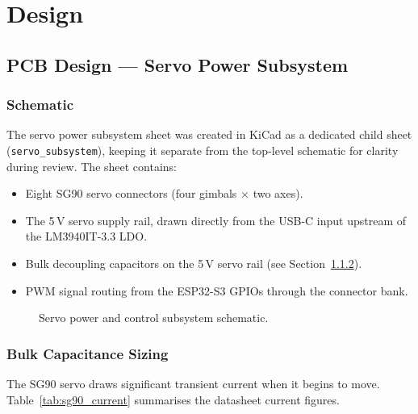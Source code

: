 \documentclass[12pt]{article}
\begin{document}
\section{Design}

\subsection{PCB Design --- Servo Power Subsystem}

\subsubsection{Schematic}

The servo power subsystem sheet was created in KiCad as a dedicated child sheet
(\texttt{servo\_subsystem}), keeping it separate from the top-level schematic for
clarity during review.  The sheet contains:

\begin{itemize}
  \item Eight SG90 servo connectors (four gimbals $\times$ two axes).
  \item The 5\,V servo supply rail, drawn directly from the USB-C input
        upstream of the LM3940IT-3.3 LDO.
  \item Bulk decoupling capacitors on the 5\,V servo rail (see
        Section~\ref{sec:bulk_cap}).
  \item PWM signal routing from the ESP32-S3 GPIOs through the connector bank.
\end{itemize}

\begin{figure}[H]
  \centering
  \caption{Servo power and control subsystem schematic.}
  \label{fig:servo_schematic}
\end{figure}

\subsubsection{Bulk Capacitance Sizing}
\label{sec:bulk_cap}

The SG90 servo draws significant transient current when it begins to move.
Table~\ref{tab:sg90_current} summarises the datasheet current figures.
\end{document}
